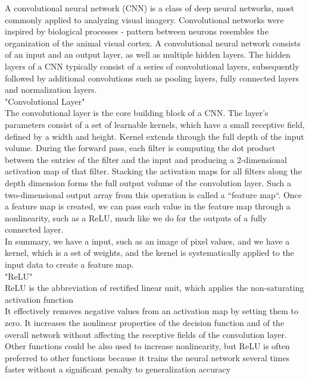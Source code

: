 A convolutional neural network (CNN) is a class of deep neural networks, most commonly applied to analyzing visual imagery. Convolutional networks were inspired by biological processes - pattern between neurons resembles the organization of the animal visual cortex. A convolutional neural network consists of an input and an output layer, as well as multiple hidden layers. The hidden layers of a CNN typically consist of a series of convolutional layers, subsequently followed by additional convolutions such as pooling layers, fully connected layers and normalization layers.\\

"Convolutional Layer"\\

The convolutional layer is the core building block of a CNN. The layer's parameters consist of a set of learnable kernels, which have a small receptive field, defined by a width and height. Kernel extends through the full depth of the input volume. During the forward pass, each filter is computing the dot product between the entries of the filter and the input and producing a 2-dimensional activation map of that filter. Stacking the activation maps for all filters along the depth dimension forms the full output volume of the convolution layer. Such a two-dimensional output array from this operation is called a “feature map“. Once a feature map is created, we can pass each value in the feature map through a nonlinearity, such as a ReLU, much like we do for the outputs of a fully connected layer.\\

In summary, we have a input, such as an image of pixel values, and we have a kernel, which is a set of weights, and the kernel is systematically applied to the input data to create a feature map.\\

"ReLU" \\

ReLU is the abbreviation of rectified linear unit, which applies the non-saturating activation function\\

It effectively removes negative values from an activation map by setting them to zero. It increases the nonlinear properties of the decision function and of the overall network without affecting the receptive fields of the convolution layer.\\

Other functions could be also used to increase nonlinearity, but ReLU is often preferred to other functions because it trains the neural network several times faster without a significant penalty to generalization accuracy\\

